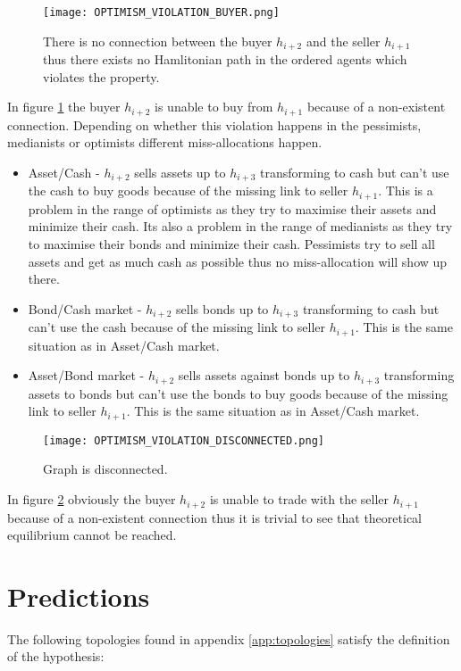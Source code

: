 \documentclass[Bachelorarbeit.tex]{subfiles}
\begin{document}
\begin{figure}[H]
	\centering
  \texttt{[image: OPTIMISM\_VIOLATION\_BUYER.png]}
  	\caption{There is no connection between the buyer $h_{i+2}$ and the seller $h_{i+1}$ thus there exists no Hamlitonian path in the ordered agents which violates the property.}
	\label{fig:OPTIMISM_VIOLATION_BUYER}
\end{figure}

In figure \ref{fig:OPTIMISM_VIOLATION_BUYER} the buyer $h_{i+2}$ is unable to buy from $h_{i+1}$ because of a non-existent connection. Depending on whether this violation happens in the pessimists, medianists or optimists different miss-allocations happen.

\begin{itemize}
\item Asset/Cash - $h_{i+2}$ sells assets up to $h_{i+3}$ transforming to cash but can't use the cash to buy goods because of the missing link to seller $h_{i+1}$. This is a problem in the range of optimists as they try to maximise their assets and minimize their cash. Its also a problem in the range of medianists as they try to maximise their bonds and minimize their cash. Pessimists try to sell all assets and get as much cash as possible thus no miss-allocation will show up there.
\item Bond/Cash market - $h_{i+2}$ sells bonds up to $h_{i+3}$ transforming to cash but can't use the cash because of the missing link to seller $h_{i+1}$. This is the same situation as in Asset/Cash market.
\item Asset/Bond market - $h_{i+2}$ sells assets against bonds up to $h_{i+3}$ transforming assets to bonds but can't use the bonds to buy goods because of the missing link to seller $h_{i+1}$. This is the same situation as in Asset/Cash market.
\end{itemize}

\begin{figure}[H]
	\centering
  \texttt{[image: OPTIMISM\_VIOLATION\_DISCONNECTED.png]}
  	\caption{Graph is disconnected.}
	\label{fig:OPTIMISM_VIOLATION_DISCONNECTED}
\end{figure}

In figure \ref{fig:OPTIMISM_VIOLATION_DISCONNECTED} obviously the buyer $h_{i+2}$ is unable to trade with the seller $h_{i+1}$ because of a non-existent connection thus it is trivial to see that theoretical equilibrium cannot be reached.

\section{Predictions}
The following topologies found in appendix \ref{app:topologies} satisfy the definition of the hypothesis:
\end{document}
